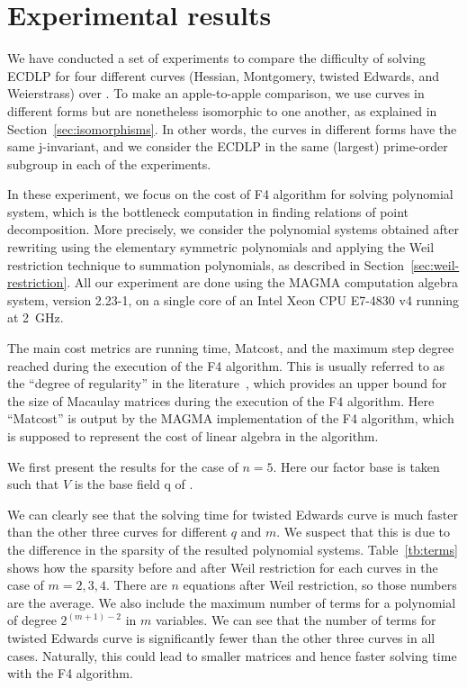 \section{Experimental results}
\label{sec:experiment}

We have conducted a set of experiments to compare the difficulty of
solving ECDLP for four different curves (Hessian, Montgomery, twisted
Edwards, and Weierstrass) over .
%
To make an apple-to-apple comparison, we use curves in different forms
but are nonetheless isomorphic to one another, as explained in
Section~\ref{sec:isomorphisms}.
%
In other words, the curves in different forms have the same
j-invariant, and we consider the ECDLP in the same (largest)
prime-order subgroup in each of the experiments.

In these experiment, we focus on the cost of F4 algorithm for solving
polynomial system, which is the bottleneck computation in finding
relations of point decomposition.
%
More precisely, we consider the polynomial systems obtained after
rewriting using the elementary symmetric polynomials and applying the
Weil restriction technique to summation polynomials, as described in
Section~\ref{sec:weil-restriction}.
%
All our experiment are done using the MAGMA computation algebra
system, version 2.23-1, on a single core of an Intel Xeon CPU E7-4830
v4 running at 2~GHz.

The main cost metrics are running time, Matcost, and the maximum step
degree reached during the execution of the F4 algorithm.
%
This is usually referred to as the ``degree of regularity'' in the
literature~\cite{DBLP:conf/indocrypt/GalbraithG14}, which provides an
upper bound for the size of Macaulay matrices during the execution of
the F4 algorithm.
%
Here ``Matcost'' is output by the MAGMA implementation of the F4
algorithm, which is supposed to represent the cost of linear algebra
in the algorithm.

We first present the results for the case of $n=5$.
%
Here our factor base is taken such that $V$ is the base field \F q of
.
%


We can clearly see that the solving time for twisted Edwards curve is
much faster than the other three curves for different $q$ and $m$.
%
We suspect that this is due to the difference in the sparsity of the
resulted polynomial systems.
%
Table~\ref{tb:terms} shows how the sparsity before and after Weil
restriction for each curves in the case of $m=2,3,4$.
%
There are $n$ equations after Weil restriction, so those numbers are
the average.
%
We also include the maximum number of terms for a polynomial of degree
$2^{(m+1)-2}$ in $m$ variables.
%
We can see that the number of terms for twisted Edwards curve is
significantly fewer than the other three curves in all cases.
%
Naturally, this could lead to smaller matrices and hence faster
solving time with the F4 algorithm.


